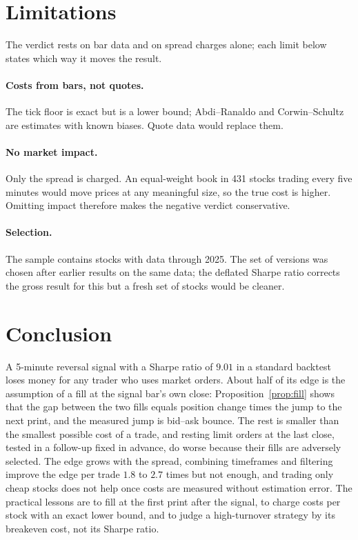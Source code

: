 \documentclass[11pt,a4paper]{article}
\begin{document}
\section{Limitations}
\label{sec:limits}

The verdict rests on bar data and on spread charges alone; each limit below states which way it moves the result.


\paragraph{Costs from bars, not quotes.} The tick floor is exact but is a lower bound; Abdi--Ranaldo and
Corwin--Schultz are estimates with known biases. Quote data would replace them.

\paragraph{No market impact.} Only the spread is charged. An equal-weight book in 431 stocks
trading every five minutes would move prices at any meaningful size, so the true cost is higher. Omitting impact therefore makes the negative verdict conservative.

\paragraph{Selection.} The sample contains stocks with data through 2025. The set of versions was chosen
after earlier results on the same data; the deflated Sharpe ratio corrects the gross result for this but a
fresh set of stocks would be cleaner.

\section{Conclusion}

A 5-minute reversal signal with a Sharpe ratio of $9.01$ in a standard backtest loses money for any
trader who uses market orders. About half of its edge is the assumption of a fill at the signal bar's own
close: Proposition~\ref{prop:fill} shows that the gap between the two fills equals position change times the
jump to the next print, and the measured jump is bid--ask bounce. The rest is smaller than the smallest
possible cost of a trade, and resting limit orders at the last close, tested in a follow-up fixed in advance,
do worse because their fills are adversely selected. The edge grows with the spread, combining timeframes and
filtering improve the edge per trade $1.8$ to $2.7$ times but not enough, and trading only cheap stocks
does not help once costs are measured without estimation error. The practical lessons are to fill at the
first print after the signal, to charge costs per stock with an exact lower bound, and to judge a
high-turnover strategy by its breakeven cost, not its Sharpe ratio.
\end{document}
